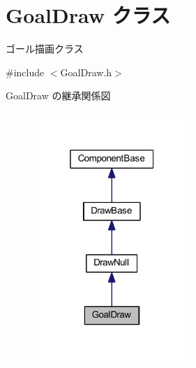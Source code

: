 \hypertarget{class_goal_draw}{}\section{Goal\+Draw クラス}
\label{class_goal_draw}


ゴール描画クラス  




{\ttfamily \#include $<$Goal\+Draw.\+h$>$}



Goal\+Draw の継承関係図\nopagebreak
\begin{figure}[H]
\begin{center}
\leavevmode
\includegraphics[width=169pt]{class_goal_draw__inherit__graph}
\end{center}
\end{figure}
